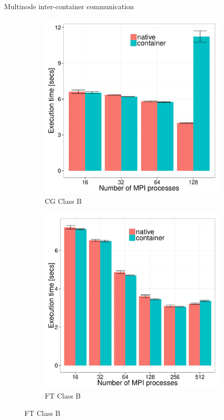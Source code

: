 \documentclass[presentation]{beamer}
\begin{document}
\begin{frame}[label=sec-3-7]{Multinode inter-container communication}
\begin{figure}
  \centering
  \begin{subfigure}[b]{0.42\textwidth}
    \includegraphics[scale=0.25,angle=0]{figures/veth_overhead-tso-cgB.pdf}
    \caption{CG Class B}
  \end{subfigure}
  \begin{subfigure}[b]{0.42\textwidth}
    \includegraphics[scale=0.25,angle=0]{figures/veth_overhead-tso-ftB.pdf}
    \caption{FT Class B}
  \end{subfigure}
\end{figure}
\end{frame}
\end{document}
